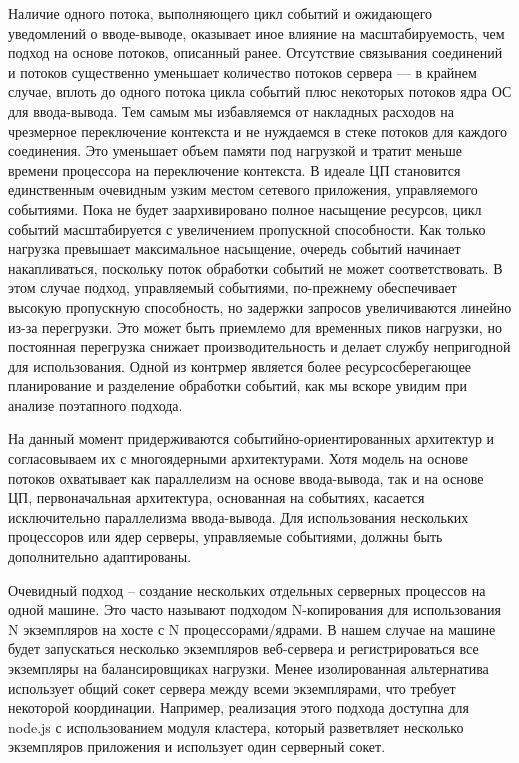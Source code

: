 Наличие одного потока, выполняющего цикл событий и ожидающего уведомлений о вводе-выводе, оказывает иное влияние на масштабируемость, чем подход на основе потоков, описанный ранее. Отсутствие связывания соединений и потоков существенно уменьшает количество потоков сервера — в крайнем случае, вплоть до одного потока цикла событий плюс некоторых потоков ядра ОС для ввода-вывода. Тем самым мы избавляемся от накладных расходов на чрезмерное переключение контекста и не нуждаемся в стеке потоков для каждого соединения. Это уменьшает объем памяти под нагрузкой и тратит меньше времени процессора на переключение контекста. В идеале ЦП становится единственным очевидным узким местом сетевого приложения, управляемого событиями. Пока не будет заархивировано полное насыщение ресурсов, цикл событий масштабируется с увеличением пропускной способности. Как только нагрузка превышает максимальное насыщение, очередь событий начинает накапливаться, поскольку поток обработки событий не может соответствовать. В этом случае подход, управляемый событиями, по-прежнему обеспечивает высокую пропускную способность, но задержки запросов увеличиваются линейно из-за перегрузки. Это может быть приемлемо для временных пиков нагрузки, но постоянная перегрузка снижает производительность и делает службу непригодной для использования. Одной из контрмер является более ресурсосберегающее планирование и разделение обработки событий, как мы вскоре увидим при анализе поэтапного подхода.

На данный момент придерживаются событийно-ориентированных архитектур и согласовываем их с многоядерными архитектурами. Хотя модель на основе потоков охватывает как параллелизм на основе ввода-вывода, так и на основе ЦП, первоначальная архитектура, основанная на событиях, касается исключительно параллелизма ввода-вывода. Для использования нескольких процессоров или ядер серверы, управляемые событиями, должны быть дополнительно адаптированы.

Очевидный подход -- создание нескольких отдельных серверных процессов на одной машине. Это часто называют подходом N-копирования для использования N экземпляров на хосте с N процессорами/ядрами. В нашем случае на машине будет запускаться несколько экземпляров веб-сервера и регистрироваться все экземпляры на балансировщиках нагрузки. Менее изолированная альтернатива использует общий сокет сервера между всеми экземплярами, что требует некоторой координации. Например, реализация этого подхода доступна для node.js с использованием модуля кластера, который разветвляет несколько экземпляров приложения и использует один серверный сокет.

